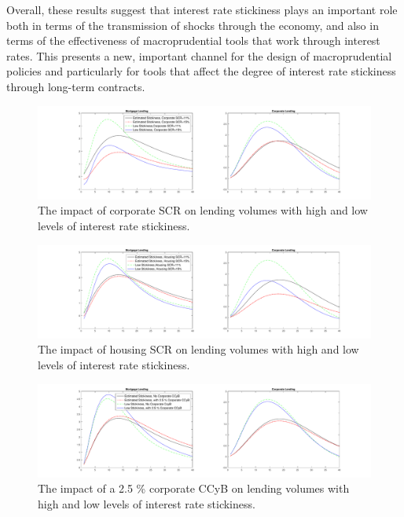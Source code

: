 \documentclass[12pt]{article}
\numberwithin{equation}{section}
\begin{document}
Overall, these results suggest that interest rate stickiness plays an important role both in terms of the transmission of shocks through the economy, and also in terms of the effectiveness of macroprudential tools that work through interest rates. This presents a new, important channel for the design of macroprudential policies and particularly for tools that affect the degree of interest rate stickiness through long-term contracts. 



\begin{figure}[H]
\centering
\caption{The impact of corporate SCR on lending volumes with high and low levels of interest rate stickiness. }
\label{irf_stickiness_corpSCR}
\includegraphics[scale=0.35]{stickiness_corporate_SCRECAB.pdf}
\end{figure}

\begin{figure}[H]{}
\centering
\caption{The impact of housing SCR on lending volumes with high and low levels of interest rate stickiness.}
\label{irf_stickiness_housingSCR}
\includegraphics[scale=0.35]{stickiness_housing_SCRECAB.pdf}
\end{figure}


\begin{figure}[H]
\centering
\caption{The impact of a 2.5 \% corporate CCyB on lending volumes with high and low levels of interest rate stickiness. }
\label{irf_stickiness_corporateCCyB}
\includegraphics[scale=0.35]{stickiness_corporate_ccybECAB.pdf}
\end{figure}
\end{document}
